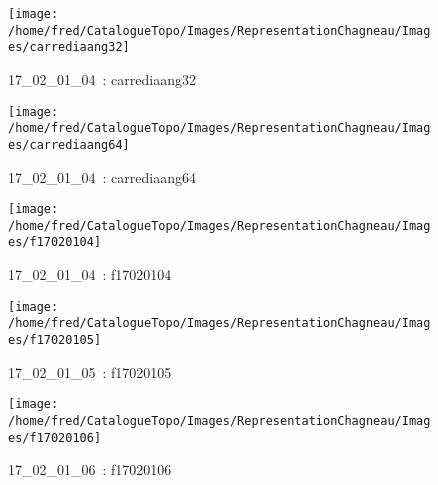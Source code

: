 \documentclass[12pt,titlepage]{book}
\begin{document}
\begin{figure}[h!]
\begin{minipage}[t]{3cm}
\begin{center}
    \end{center}
  \end{minipage}
  \begin{minipage}[t]{3cm}
    \begin{center}
      \texttt{[image: /home/fred/CatalogueTopo/Images/RepresentationChagneau/Images/carrediaang32]}
      \caption[~17\_02\_01\_04]{\small{17\_02\_01\_04~:} \tiny{carrediaang32}}\label{carrediaang32}
    \end{center}
  \end{minipage}
  \begin{minipage}[t]{3cm}
    \begin{center}
      \texttt{[image: /home/fred/CatalogueTopo/Images/RepresentationChagneau/Images/carrediaang64]}
      \caption[~17\_02\_01\_04]{\small{17\_02\_01\_04~:} \tiny{carrediaang64}}\label{carrediaang64}
    \end{center}
  \end{minipage}
  \begin{minipage}[t]{3cm}
    \begin{center}
      \texttt{[image: /home/fred/CatalogueTopo/Images/RepresentationChagneau/Images/f17020104]}
      \caption[~17\_02\_01\_04]{\small{17\_02\_01\_04~:} \tiny{f17020104}}\label{f17020104}
    \end{center}
  \end{minipage}
  \begin{minipage}[t]{3cm}
    \begin{center}
      \texttt{[image: /home/fred/CatalogueTopo/Images/RepresentationChagneau/Images/f17020105]}
      \caption[~17\_02\_01\_05]{\small{17\_02\_01\_05~:} \tiny{f17020105}}\label{f17020105}
    \end{center}
  \end{minipage}
  \begin{minipage}[t]{3cm}
    \begin{center}
      \texttt{[image: /home/fred/CatalogueTopo/Images/RepresentationChagneau/Images/f17020106]}
      \caption[~17\_02\_01\_06]{\small{17\_02\_01\_06~:} \tiny{f17020106}}\label{f17020106}
    \end{center}
  \end{minipage}
  \begin{minipage}[t]{3cm}

\end{minipage}
\end{figure}
\end{document}
